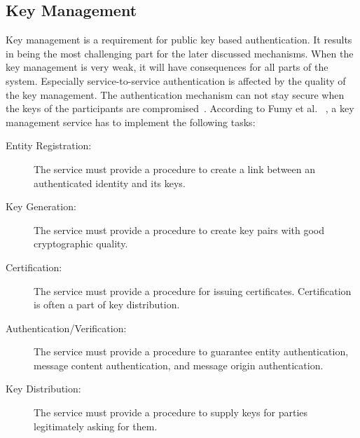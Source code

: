 \subsection{Key Management} \label{sec:key_management}
Key management is a requirement for public key based authentication. 
It results in being the most challenging part for the later discussed mechanisms.
When the key management is very weak, it will have consequences for all parts of the system.
Especially service-to-service authentication is affected by the quality of the key management.
The authentication mechanism can not stay secure when the keys of the participants are compromised~\cite{dias2020microservices, fumy1993principles}.
According to Fumy et al. ~\cite{fumy1993principles}, a key management service has to implement the following tasks:
\begin{description}
	\item[Entity Registration:] The service must provide a procedure to create a link between an authenticated identity and its keys.
	\item[Key Generation:] The service must provide a procedure to create key pairs with good cryptographic quality.
	\item[Certification:] The service must provide a procedure for issuing certificates. Certification is often a part of key distribution.
	\item[Authentication/Verification:] The service must provide a procedure to guarantee entity authentication, message content authentication, and message origin authentication.
	\item[Key Distribution:] The service must provide a procedure to supply keys for parties legitimately asking for them.
\end{description}

